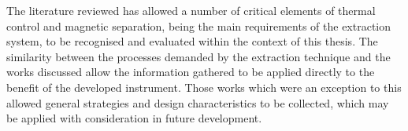 The literature reviewed has allowed a number of critical elements of thermal control and magnetic separation, being the main requirements of the extraction system, to be recognised and evaluated within the context of this thesis. The similarity between the processes demanded by the extraction technique and the works discussed allow the information gathered to be applied directly to the benefit of the developed instrument. Those works which were an exception to this allowed general strategies and design characteristics to be collected, which may be applied with consideration in future development.

